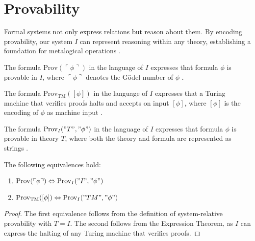 \documentclass[runningheads]{llncs}
\begin{document}
\section{Provability}

Formal systems not only express relations but reason about them. By encoding provability, our system $I$ can represent reasoning within any theory, establishing a foundation for metalogical operations \cite{Godel1931} \cite{Turing1936}.

\begin{definition}
    The formula $\text{Prov}(\ulcorner\phi\urcorner)$ in the language of $I$ expresses that formula $\phi$ is provable in $I$, where $\ulcorner\phi\urcorner$ denotes the Gödel number of $\phi$ \cite{Godel1931}.
\end{definition}

\medskip

\begin{definition}
    The formula $\text{Prov}_{\text{TM}}([\phi])$ in the language of $I$ expresses that a Turing machine that verifies proofs halts and accepts on input $[\phi]$, where $[\phi]$ is the encoding of $\phi$ as machine input \cite{Turing1936}.
\end{definition}

\medskip

\begin{definition}
    The formula $\text{Prov}_I("T","\phi")$ in the language of $I$ expresses that formula $\phi$ is provable in theory $T$, where both the theory and formula are represented as strings \cite{TarskiMostowskiRobinson1953}.
\end{definition}

\medskip

\begin{theorem}
    The following equivalences hold:
    \begin{enumerate}
        \item $\text{Prov}(\ulcorner \phi \urcorner) \Leftrightarrow \text{Prov}_I("I","\phi")$
        \item $\text{Prov}_{\text{TM}}([\phi]) \Leftrightarrow \text{Prov}_I("TM","\phi")$
    \end{enumerate}
\end{theorem}

\begin{proof}
    The first equivalence follows from the definition of system-relative provability with $T = I$. The second follows from the Expression Theorem, as $I$ can express the halting of any Turing machine that verifies proofs.
\end{proof}
\end{document}
